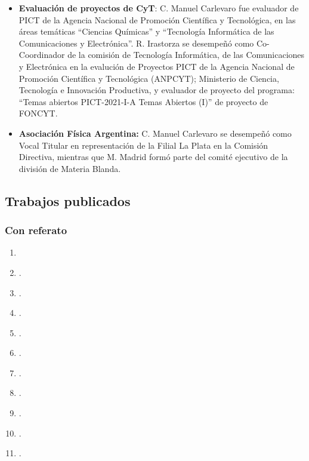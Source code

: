 \documentclass[a4paper,11pt,twoside,final,titlepage,onecolumn,openright]{report}
\begin{document}
\begin{itemize}

\item \textbf{Evaluación de proyectos de CyT}: C. Manuel Carlevaro fue evaluador de PICT de la Agencia Nacional de Promoción Científica y Tecnológica, en las áreas temáticas ``Ciencias Químicas'' y ``Tecnología Informática de las Comunicaciones y Electrónica''. R. Irastorza se desempeñó como Co-Coordinador de la comisión de Tecnología Informática, de las Comunicaciones y Electrónica en la evalución de Proyectos PICT de la Agencia Nacional de Promoción Científica y Tecnológica (ANPCYT); Ministerio de Ciencia, Tecnología e Innovación Productiva, y evaluador de proyecto del programa: ``Temas abiertos PICT-2021-I-A Temas Abiertos (I)'' de proyecto de FONCYT. 
 
\item \textbf{Asociación Física Argentina:} C. Manuel Carlevaro se desempeñó como Vocal Titular en representación de la Filial La Plata en la Comisión Directiva, mientras que M. Madrid formó parte del comité ejecutivo de la división de Materia Blanda.
 
\end{itemize}


\subsection{Trabajos publicados}

\subsubsection{Con referato}

% 


\begin{enumerate}
    \item {}
    \item {}.
    \item {}.
    \item {}.
    \item {}.
    \item {}.
    \item {}.
    \item {}.
    \item {}.
    \item {}.
    \item {}.
\end{enumerate}
\end{document}

